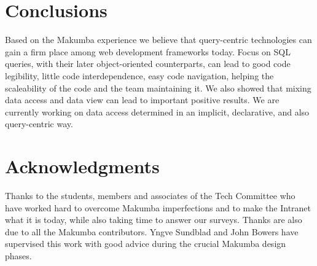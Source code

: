 \documentclass{llncs}
\begin{document}
\section{Conclusions}\label{sec:conclusions}
Based on the Makumba experience we believe that query-centric technologies can gain a firm place among web development frameworks today. Focus on SQL queries, with their later object-oriented counterparts, can lead to good  code legibility, little code interdependence, easy code navigation,  helping the scaleability of the code and the team maintaining it.  We also showed that mixing data access and data view can lead to important positive results. We are currently working on data access determined in an implicit, declarative, and also query-centric way. 

\section{Acknowledgments}\label{sec:acknowledgments}
Thanks to the students, members and associates of the Tech Committee who have worked hard to overcome Makumba imperfections and to make the Intranet what it is today, while also taking time to answer our surveys.  Thanks are also due to all the Makumba contributors.  Yngve Sundblad and John Bowers have supervised this work with good advice during the crucial Makumba design phases.



 
\end{document}
